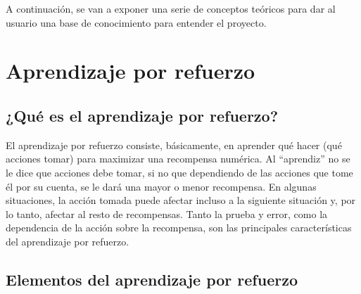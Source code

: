
A continuación, se van a exponer una serie de conceptos teóricos para dar al usuario una base de conocimiento para entender el proyecto.


\section{Aprendizaje por refuerzo}

\subsection{¿Qué es el aprendizaje por refuerzo?}

El aprendizaje por refuerzo consiste, básicamente, en aprender qué hacer (qué acciones tomar) para maximizar una recompensa numérica. Al “aprendiz” no se le dice que acciones debe tomar, si no que dependiendo de las acciones que tome él por su cuenta, se le dará una mayor o menor recompensa.
En algunas situaciones, la acción tomada puede afectar incluso a la siguiente situación y, por lo tanto, afectar al resto de recompensas. Tanto la prueba y error, como la dependencia de la acción sobre la recompensa, son las principales características del aprendizaje por refuerzo.

\subsection{Elementos del aprendizaje por refuerzo}

